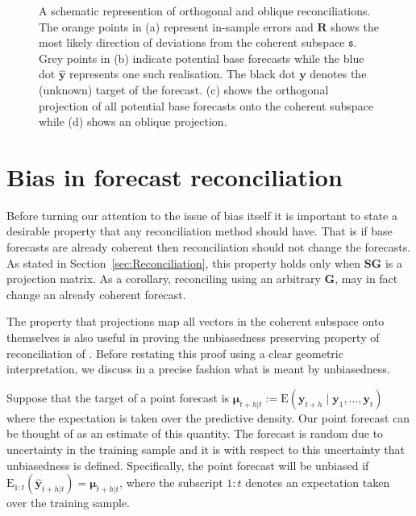 \documentclass[12pt]{article}
\def\E{\text{E}}
\theoremstyle{definition}
\begin{document}
\begin{figure}[!p]
\begin{subfigure}[!h]{0.415\textwidth}
      \caption{}
  \end{subfigure}
  \caption{A schematic represention of orthogonal and oblique reconciliations. The orange points in (a) represent in-sample errors and $\bm{R}$ shows the most likely direction of deviations from the coherent subspace $\mathfrak{s}$. Grey points in (b) indicate potential base forecasts while the blue dot ${\hat{\bm y}}$ represents one such realisation. The black dot ${\bm y}$ denotes the (unknown) target of the forecast. (c) shows the orthogonal projection of all potential base forecasts onto the coherent subspace while (d) shows an oblique projection.}\label{fig:OthogonalVSOblique_projection}
\end{figure}

\section{Bias in forecast reconciliation}\label{sec:BiasInRecon}

Before turning our attention to the issue of bias itself it is important to state a desirable property that any reconciliation method should have. That is if base forecasts are already coherent then reconciliation should not change the forecasts. As stated in Section~\ref{sec:Reconciliation}, this property holds only when $\bm{S}\bm{G}$ is a projection matrix. As a corollary, reconciling using an arbitrary $\bm{G}$, may in fact change an already coherent forecast.

The property that projections map all vectors in the coherent subspace onto themselves is also useful in proving the unbiasedness preserving property of reconciliation of \citet{WicEtAl2019}. Before restating this proof using a clear geometric interpretation, we discuss in a precise fashion what is meant by unbiasedness.

Suppose that the target of a point forecast is $\bm{\mu}_{t+h|t}:=\E(\bm{y}_{t+h}\mid\bm{y}_{1},\dots,\bm{y}_{t})$ where the expectation is taken over the predictive density. Our point forecast can be thought of as an estimate of this quantity. The forecast is random due to uncertainty in the training sample and it is with respect to this uncertainty that unbiasedness is defined. Specifically, the point forecast will be unbiased if $\E_{1:t}(\hat{\bm{y}}_{t+h|t})=\bm{\mu}_{t+h|t}$, where the subscript $1:t$ denotes an expectation taken over the training sample.
\end{document}

